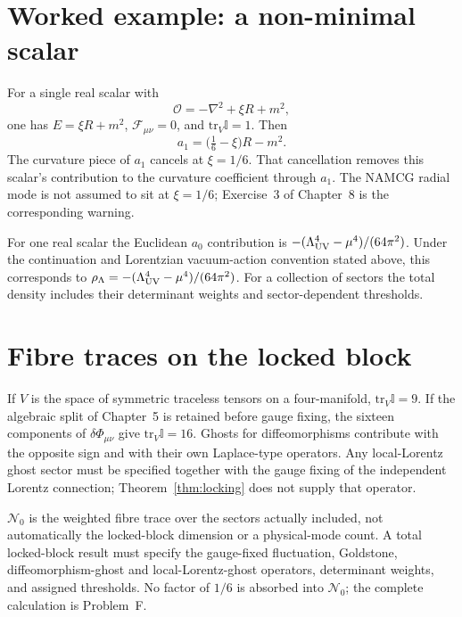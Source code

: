 \section{Worked example: a non-minimal scalar}
\label{sec:appA-scalar}

For a single real scalar with
\begin{equation}
  \label{eq:appA-scalar}
  \mathcal{O}=-\nabla^2+\xi R+m^2,
\end{equation}
one has \(E=\xi R+m^2\), \(\mathcal{F}_{\mu\nu}=0\), and
\(\mathrm{tr}_V\mathbb{I}=1\). Then
\begin{equation}
  \label{eq:appA-scalar-a1}
  a_1=\bigl(\tfrac16-\xi\bigr)R-m^2.
\end{equation}
The curvature piece of \(a_1\) cancels at \(\xi=1/6\). That
cancellation removes this scalar's contribution to the curvature
coefficient through \(a_1\). The NAMCG radial
mode is not assumed to sit at \(\xi=1/6\); Exercise~3 of
Chapter~8 is the corresponding warning.

For one real scalar the Euclidean \(a_0\) contribution is
\(-(\Lambda_{\mathrm{UV}}^4-\mu^4)/(64\pi^2)\). Under the continuation and Lorentzian
vacuum-action convention stated above, this corresponds to
\(\rho_\Lambda=-(\Lambda_{\mathrm{UV}}^4-\mu^4)/(64\pi^2)\). For a collection of
sectors the total density includes their determinant weights and
sector-dependent thresholds.

\section{Fibre traces on the locked block}
\label{sec:appA-fibre}

If \(V\) is the space of symmetric traceless tensors on a
four-manifold, \(\mathrm{tr}_V\mathbb{I}=9\). If the algebraic
split of Chapter~5 is retained before gauge fixing, the sixteen
components of \(\delta\Phi_{\mu\nu}\) give
\(\mathrm{tr}_V\mathbb{I}=16\). Ghosts for diffeomorphisms
contribute with the opposite sign and with their own Laplace-type
operators. Any local-Lorentz ghost sector must be specified together
with the gauge fixing of the independent Lorentz connection;
Theorem~\ref{thm:locking} does not supply that operator.

\(\mathcal N_0\) is the weighted fibre trace over the sectors actually
included, not automatically the locked-block dimension or a
physical-mode count. A total locked-block result must specify the
gauge-fixed fluctuation, Goldstone, diffeomorphism-ghost and
local-Lorentz-ghost operators, determinant weights, and assigned
thresholds. No factor of \(1/6\) is absorbed into \(\mathcal N_0\);
the complete calculation is Problem~F.

